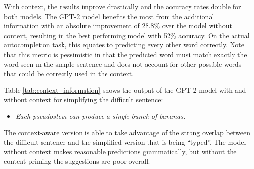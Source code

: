 \documentclass[11pt]{article}
\begin{document}
With context, the results improve drastically and the accuracy rates double for both models.  The GPT-2 model benefits the most from the additional information with an absolute improvement of 28.8\% over the model without context, resulting in the best performing model with 52\% accuracy.  On the actual autocompletion task, this equates to predicting every other word correctly.  Note that this metric is pessimistic in that the predicted word must match exactly the word seen in the simple sentence and does not account for other possible words that could be correctly used in the context.

Table \ref{tab:context_information} shows the output of the GPT-2 model with and without context for simplifying the difficult sentence:

\vspace{-0.1in}
\begin{itemize}
    \item[] \textit{Each pseudostem can produce a single bunch of bananas.}
\end{itemize}

\vspace{-0.1in}

\noindent The context-aware version is able to take advantage of the strong overlap between the difficult sentence and the simplified version that is being ``typed''.  The model without context makes reasonable predictions grammatically, but without the content priming the suggestions are poor overall.
\end{document}
